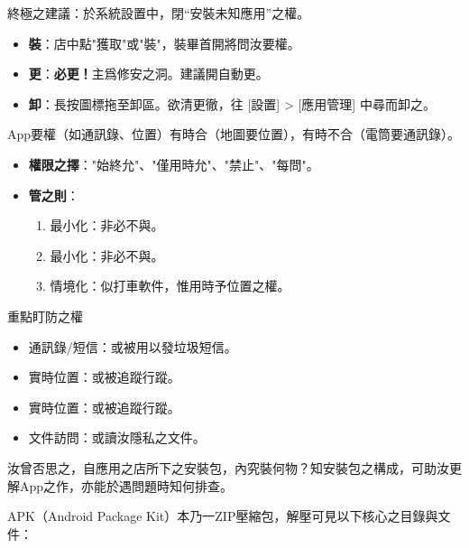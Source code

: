 終極之建議：於系統設置中，閉“安裝未知應用”之權。


\begin{itemize}
  \item \textbf{裝}：店中點"獲取"或"裝"，裝畢首開將問汝要權。
  \item \textbf{更}：\textbf{必更！}主爲修安之洞。建議開自動更。
  \item \textbf{卸}：長按圖標拖至卸區。欲清更徹，往 [設置] > [應用管理] 中尋而卸之。
\end{itemize}


App要權（如通訊錄、位置）有時合（地圖要位置），有時不合（電筒要通訊錄）。

\begin{itemize}
  \item \textbf{權限之擇}："始終允"、"僅用時允"、"禁止"、"每問"。
  \item \textbf{管之則}：
  \begin{enumerate}
    \item 最小化：非必不與。
    \item 最小化：非必不與。
    \item 情境化：似打車軟件，惟用時予位置之權。
  \end{enumerate}
\end{itemize}

\begin{tcbwarn}{重點盯防之權}
\begin{itemize}
  \item 通訊錄/短信：或被用以發垃圾短信。
  \item 實時位置：或被追蹤行蹤。
  \item 實時位置：或被追蹤行蹤。
  \item 文件訪問：或讀汝隱私之文件。
\end{itemize}

\end{tcbwarn}


汝曾否思之，自應用之店所下之安裝包，內究裝何物？知安裝包之構成，可助汝更解App之作，亦能於遇問題時知何排查。


APK（Android Package Kit）本乃一ZIP壓縮包，解壓可見以下核心之目錄與文件：

